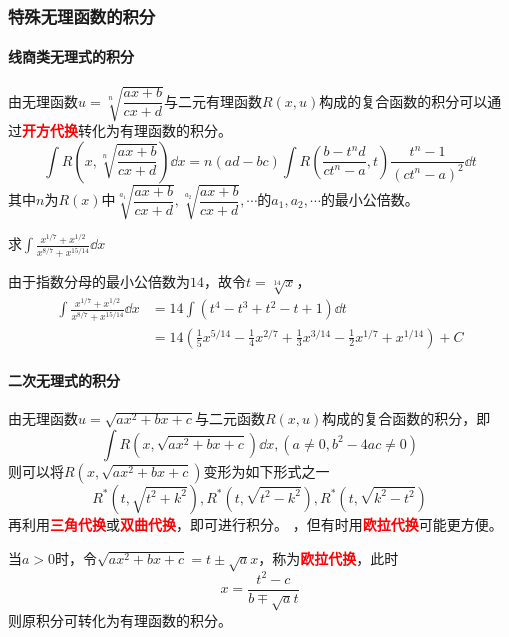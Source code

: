 \subsubsection{特殊无理函数的积分}
\paragraph{线商类无理式的积分}
由无理函数$u=\sqrt[n]{\dfrac{ax+b}{cx+d}}$与二元有理函数$R(x,u)$构成的复合函数的积分可以通过\textcolor{red}{\textbf{\textsf{开方代换}}}转化为有理函数的积分。
\[ \int R\left(x,\sqrt[n]{\frac{ax+b}{cx+d}}\right)\dd{x} = n(ad-bc)\int R\left(\frac{b-t^nd}{ct^n-a},t\right)\frac{t^n-1}{(ct^n-a)^2}\dd{t} \]
其中$n$为$R(x)$中$\sqrt[a_1]{\dfrac{ax+b}{cx+d}},\sqrt[a_2]{\dfrac{ax+b}{cx+d}},\cdots$的$a_1,a_2,\cdots$的最小公倍数。
\begin{example}
    求$\displaystyle\int\frac{x^{1/7}+x^{1/2}}{x^{8/7}+x^{15/14}}\dd{x}$
\end{example}
\begin{solution}
    由于指数分母的最小公倍数为$14$，故令$t=\sqrt[14]{x}$，
    \begin{align*}
        \int\frac{x^{1/7}+x^{1/2}}{x^{8/7}+x^{15/14}}\dd{x} & = 14\int(t^4-t^3+t^2-t+1)\dd{t}                                                                        \\
                                                      & =14(\frac{1}{5}x^{5/14} - \frac{1}{4}x^{2/7} + \frac{1}{3}x^{3/14} - \frac{1}{2}x^{1/7} + x^{1/14}) +C
    \end{align*}
\end{solution}

\paragraph{二次无理式的积分}
由无理函数$u=\sqrt{ax^2+bx+c}$与二元函数$R(x,u)$构成的复合函数的积分，即
\[ \int R(x,\sqrt{ax^2+bx+c})\dd{x}, (a\neq 0, b^2-4ac\neq 0) \]
则可以将$R(x,\sqrt{ax^2+bx+c})$变形为如下形式之一
\[ R^*(t, \sqrt{t^2+k^2}), R^*(t, \sqrt{t^2-k^2}), R^*(t, \sqrt{k^2-t^2}) \]
再利用\textcolor{red}{\textsf{\textbf{三角代换}}}或\textcolor{red}{\textsf{\textbf{双曲代换}}}，即可进行积分。
，但有时用\textcolor{red}{\textsf{\textbf{欧拉代换}}}可能更方便。

当$a>0$时，令$\sqrt{ax^2+bx+c}=t\pm\sqrt{a}x$，称为\textcolor{red}{\textsf{\textbf{欧拉代换}}}，此时
\[x=\frac{t^2-c}{b\mp\sqrt{a}t}\]
则原积分可转化为有理函数的积分。

